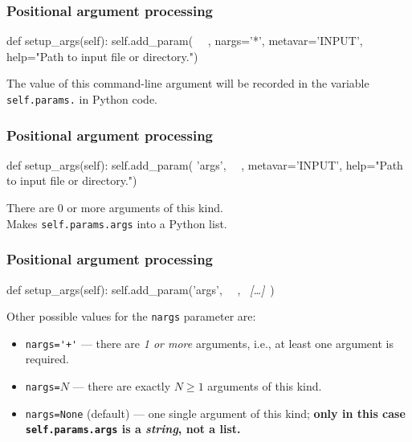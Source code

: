 \documentclass[english,serif,mathserif,xcolor=pdftex,dvipsnames,table]{beamer}
\begin{document}
\begin{frame}[fragile]
  \frametitle{Positional argument processing}

\begin{python}
  def setup_args(self):
    self.add_param(
      ~~, nargs='*', metavar='INPUT',
      help="Path to input file or directory.")
\end{python}

  \+
  The value of this command-line argument will be recorded in the
  variable \texttt{self.params.} in Python code.
\end{frame}


\begin{frame}[fragile]
  \frametitle{Positional argument processing}

\begin{python}
  def setup_args(self):
    self.add_param(
      'args', ~~, metavar='INPUT',
      help="Path to input file or directory.")
\end{python}

  \+
  There are 0 or more arguments of this kind.  \\
  Makes \lstinline|self.params.args| into a Python list.
\end{frame}


\begin{frame}[fragile]
  \frametitle{Positional argument processing}

\begin{python}
  def setup_args(self):
    self.add_param('args', ~~, ~{\em [\ldots]}~)
\end{python}

  \+
  Other possible values for the \texttt{nargs} parameter are:
  \begin{itemize}
  \item \lstinline|nargs='+'| --- there are \emph{1 or more} arguments,
    i.e., at least one argument is required.
  \item \lstinline|nargs=|$N$ --- there are exactly $N \geq 1$ arguments of this kind.
  \item \lstinline|nargs=None| (default) --- one single argument of this
    kind; \textbf{only in this case \lstinline|self.params.args| is a
    \emph{string}, not a list.}
  \end{itemize}
\end{frame}
\end{document}
